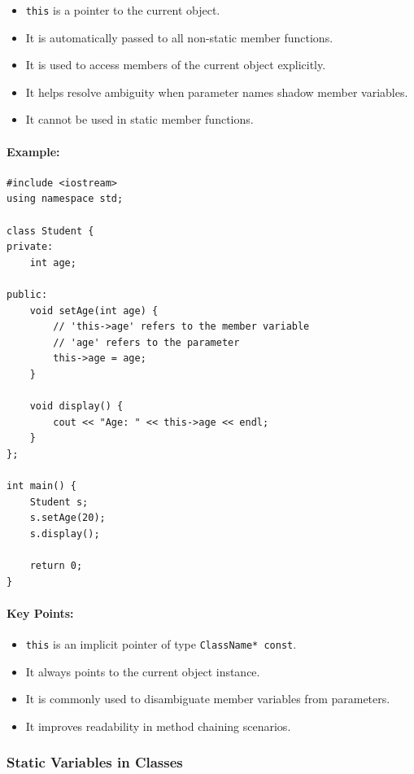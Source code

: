 \documentclass[10pt]{article}
\begin{document}
\begin{itemize}
    \item \verb|this| is a pointer to the current object.
    \item It is automatically passed to all non-static member functions.
    \item It is used to access members of the current object explicitly.
    \item It helps resolve ambiguity when parameter names shadow member variables.
    \item It cannot be used in static member functions.
\end{itemize}

\paragraph{Example:}

\begin{verbatim}
#include <iostream>
using namespace std;

class Student {
private:
    int age;

public:
    void setAge(int age) {
        // 'this->age' refers to the member variable
        // 'age' refers to the parameter
        this->age = age;
    }

    void display() {
        cout << "Age: " << this->age << endl;
    }
};

int main() {
    Student s;
    s.setAge(20);
    s.display();

    return 0;
}
\end{verbatim}

\paragraph{Key Points:}

\begin{itemize}
    \item \verb|this| is an implicit pointer of type \verb|ClassName* const|.
    \item It always points to the current object instance.
    \item It is commonly used to disambiguate member variables from parameters.
    \item It improves readability in method chaining scenarios.
\end{itemize}

\newpage
\subsubsection{Static Variables in Classes}
\end{document}
